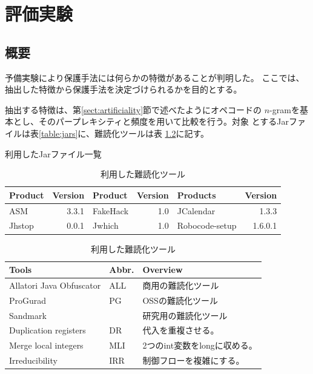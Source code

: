 \documentclass[12pt,twoside]{jreport}
\begin{document}
\chapter{評価実験}

\section{概要}


予備実験により保護手法には何らかの特徴があることが判明した。
ここでは、抽出した特徴から保護手法を決定づけられるかを目的とする。

抽出する特徴は、第\ref{sect:artificiality}節で述べたようにオペコードの
$n$-gramを基本とし、そのパープレキシティと頻度を用いて比較を行う。対象
とするJarファイルは表\ref{table:jars}に、難読化ツールは表
\ref{table:tools}に記す。

\begin{table}[t]
  \centering
  \footnotesize{
    \caption{利用したJarファイル一覧}\label{table:jars}
  \begin{tabular}{l|r||l|r||l|r}
    Product & Version & Product & Version & Products & Version \\ \hline
    ASM       & 3.3.1 & FakeHack  & 1.0 &JCalendar & 1.3.3   \\
    Jhstop    & 0.0.1 & Jwhich    & 1.0   & Robocode-setup & 1.6.0.1 
  \end{tabular}
  \caption{利用した難読化ツール}\label{table:tools}
  \begin{tabular}{ll|l}
      Tools & Abbr. & Overview \\ \hline
      Allatori Java Obfuscator & ALL & 商用の難読化ツール \\ \hline
      ProGurad                 & PG & OSSの難読化ツール \\ \hline
      Sandmark                 & & 研究用の難読化ツール \\
      \hspace{0.2cm} Duplication registers & DR & 代入を重複させる。\\
      \hspace{0.2cm} Merge local integers & MLI & 2つのint変数をlongに収める。\\
      \hspace{0.2cm} Irreducibility       & IRR & 制御フローを複雑にする。\\
  \end{tabular}}
\end{table}
\end{document}

